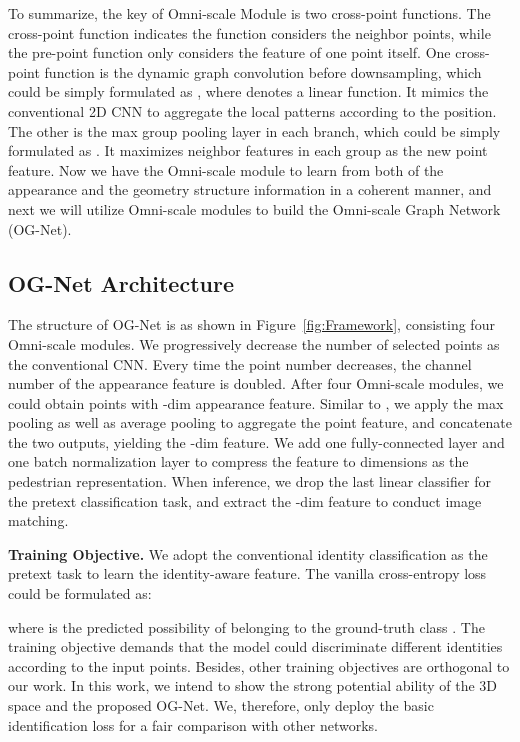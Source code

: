 To summarize, the key of Omni-scale Module is two cross-point functions. The cross-point function indicates the function considers the neighbor points, while the pre-point function only considers the feature of one point itself. One cross-point function is the dynamic graph convolution before downsampling, which could be simply formulated as , where  denotes a linear function. It mimics the conventional 2D CNN to aggregate the local patterns according to the position.
The other is the max group pooling layer in each branch, which could be simply formulated as . It maximizes neighbor features in each group as the new point feature. 
Now we have the Omni-scale module to learn from both of the appearance and the geometry structure information in a coherent manner, and next we will utilize Omni-scale modules to build the Omni-scale Graph Network (OG-Net).

\subsection{OG-Net Architecture} 
The structure of OG-Net is as shown in Figure~\ref{fig:Framework}, consisting four Omni-scale modules. We progressively decrease the number of selected points as the conventional CNN. Every time the point number decreases, the channel number of the appearance feature is doubled. After four Omni-scale modules, we could obtain  points with -dim appearance feature. Similar to \cite{wang2019dynamic}, we apply the max pooling as well as average pooling to aggregate the point feature, and concatenate the two outputs, yielding the -dim feature. We add one fully-connected layer and one batch normalization layer to compress the feature to  dimensions as the pedestrian representation. When inference, we drop the last linear classifier for the pretext classification task, and extract the -dim feature to conduct image matching. 

\noindent\textbf{Training Objective.} We adopt the conventional identity classification as the pretext task to learn the identity-aware feature. The vanilla cross-entropy loss could be formulated as:
 
where  is the predicted possibility of  belonging to the ground-truth class . The training objective demands that the model could discriminate different identities according to the input points. Besides, other training objectives are orthogonal to our work. In this work, we intend to show the strong potential ability of the 3D space and the proposed OG-Net. We, therefore, only deploy the basic identification loss for a fair comparison with other networks.

